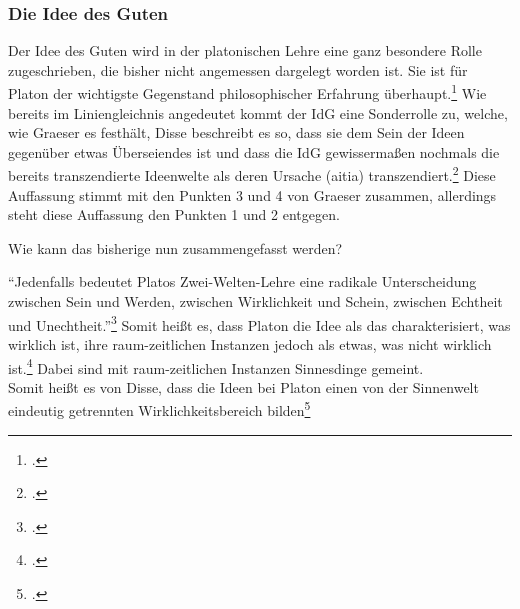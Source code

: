 \subsubsection{Die Idee des Guten}
Der Idee des Guten wird in der platonischen Lehre eine ganz besondere Rolle zugeschrieben, die bisher nicht angemessen dargelegt worden ist. Sie ist  für Platon der wichtigste Gegenstand philosophischer Erfahrung überhaupt.\footcite[vgl.][S. 158]{GraeserPhiloGeschichte}
Wie bereits im Liniengleichnis angedeutet kommt der IdG eine Sonderrolle zu, welche, wie Graeser es festhält, 
Disse beschreibt es so, dass sie dem Sein der Ideen gegenüber etwas Überseiendes ist und dass die IdG gewissermaßen nochmals die bereits transzendierte Ideenwelte als deren Ursache (aitia) transzendiert.\footcite[vgl.][S. 50]{DisseMetaphysik}
Diese Auffassung stimmt mit den Punkten 3 und 4 von Graeser zusammen, allerdings steht diese Auffassung den Punkten 1 und 2 entgegen. 

Wie kann das bisherige nun zusammengefasst werden?

\enquote{Jedenfalls bedeutet Platos Zwei-Welten-Lehre eine radikale Unterscheidung zwischen Sein und Werden, zwischen Wirklichkeit und Schein, zwischen Echtheit und Unechtheit.}\footcite[][S. 134]{GraeserPhiloGeschichte}
Somit heißt es, dass Platon die Idee als das charakterisiert, was wirklich ist, ihre raum-zeitlichen Instanzen jedoch als etwas, was nicht wirklich ist.\footcite[vgl.][S. 139]{GraeserPhiloGeschichte} Dabei sind mit raum-zeitlichen Instanzen Sinnesdinge gemeint.\\
Somit heißt es von Disse, dass die Ideen bei Platon einen von der Sinnenwelt eindeutig getrennten Wirklichkeitsbereich bilden\footcite[][S. 31]{DisseMetaphysik}


